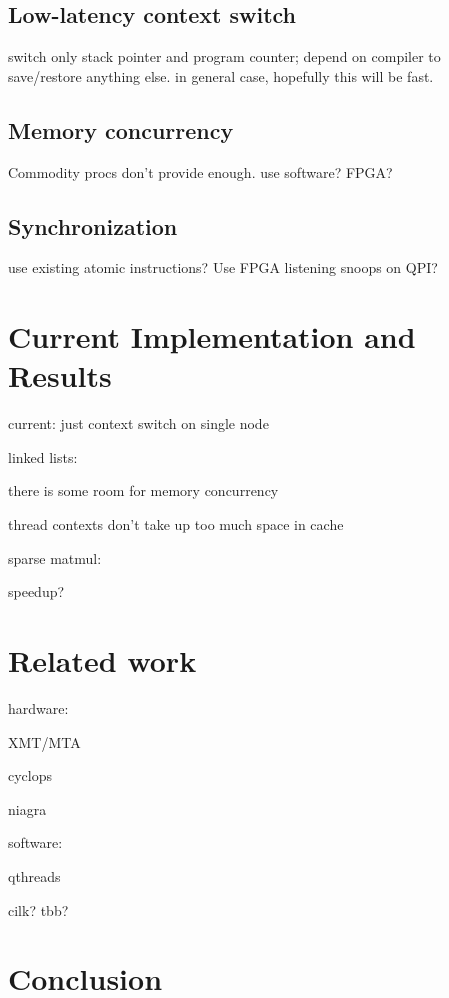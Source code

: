 \documentclass{acm_proc_article-sp}
\begin{document}
\subsection{Low-latency context switch}

switch only stack pointer and program counter; depend on compiler to save/restore anything else. in general case, hopefully this will be fast.

\subsection{Memory concurrency}

Commodity procs don't provide enough. use software? FPGA?

\subsection{Synchronization}

use existing atomic instructions? Use FPGA listening snoops on QPI?

\section{Current Implementation and Results}

current: just context switch on single node


linked lists:

there is some room for memory concurrency

thread contexts don't take up too much space in cache

sparse matmul:

speedup?






\section{Related work}


hardware:

XMT/MTA

cyclops

niagra

software:

qthreads

cilk? tbb?



\section{Conclusion}
\end{document}
